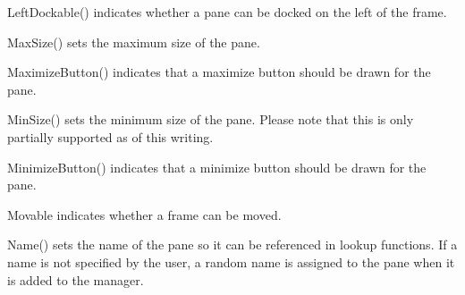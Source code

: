 
LeftDockable() indicates whether a pane can be docked on the left of the frame.

\label{wxauipaneinfomaxsize}



MaxSize() sets the maximum size of the pane.

\label{wxauipaneinfomaximizebutton}


MaximizeButton() indicates that a maximize button should be drawn for the pane.

\label{wxauipaneinfominsize}



MinSize() sets the minimum size of the pane. Please note that this is only partially supported as of this writing.

\label{wxauipaneinfominimizebutton}


MinimizeButton() indicates that a minimize button should be drawn for the pane.

\label{wxauipaneinfomovable}


Movable indicates whether a frame can be moved.

\label{wxauipaneinfoname}


Name() sets the name of the pane so it can be referenced in lookup functions. If a name is not specified by the user, a random name is assigned to the pane when it is added to the manager.

\label{wxauipaneinfopaneborder}

